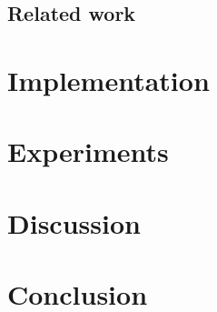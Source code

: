\documentclass[titlepage]{article}
\begin{document}
\subsection{Related work}


\section{Implementation}


\section{Experiments}


\section{Discussion}


\section{Conclusion}




\end{document}
